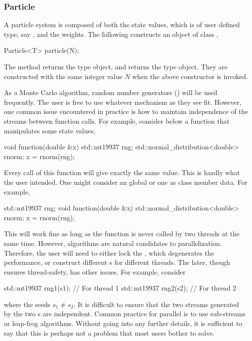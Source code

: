 \subsubsection{Particle}
\label{ssub:Particle}

A particle system is composed of both the state values, which is of user
defined type, say , and the weights. The following constructs an
object of class ,
\begin{cppcode}
  Particle<T> particle(N);
\end{cppcode}
The method  returns the type  object,
and  returns the type  object.
They are constructed with the same integer value $N$ when the above constructor
is invoked.

As a Monte Carlo algorithm, random number generators (\rng) will be used
frequently. The user is free to use whatever \rng mechanism as they see fit.
However, one common issue encountered in practice is how to maintain
independence of the \rng streams between function calls. For example, consider
below a function that manipulates some state values,
\begin{cppcode}
  void function(double &x)
  {
    std::mt19937 rng;
    std::normal_distribution<double> rnorm;
    x = rnorm(rng);
  }
\end{cppcode}
Every call of this function will give  exactly the same value.
This is hardly what the user intended. One might consider an global \rng or one
as class member data. For example,
\begin{cppcode}
  std::mt19937 rng;
  void function(double &x)
  {
    std::normal_distribution<double> rnorm;
    x = rnorm(rng);
  }
\end{cppcode}
This will work fine as long as the function is never called by two threads at
the same time. However, \smc algorithms are natural candidates to
parallelization. Therefore, the user will need to either lock the \rng, which
degenerates the performance, or construct different \rng{}s for different
threads. The later, though ensures thread-safety, has other issues. For
example, consider
\begin{cppcode}
  std::mt19937 rng1(s1); // For thread 1
  std::mt19937 rng2(s2); // For thread 2
\end{cppcode}
where the seeds $s_1 \ne s_2$. It is difficult to ensure that the two streams
generated by the two \rng{}s are independent. Common practice for parallel \rng
is to use sub-streams or leap-frog algorithms. Without going into any further
details, it is sufficient to say that this is perhaps not a problem that most
users bother to solve.

